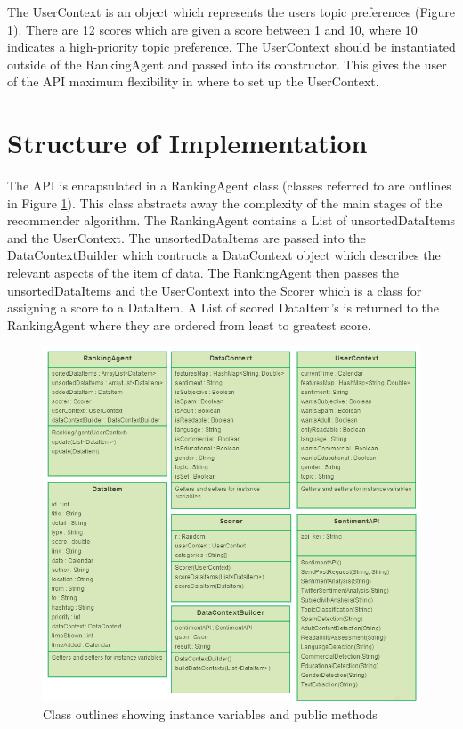 The UserContext is an object which represents the users topic preferences (Figure \ref{classes}). There are 12 scores which are given a score between 1 and 10, where 10 indicates a high-priority topic preference. The UserContext should be instantiated outside of the RankingAgent and passed into its constructor. This gives the user of the API maximum flexibility in where to set up the UserContext. 

\section{Structure of Implementation}

The API is encapsulated in a RankingAgent class (classes referred to are outlines in Figure \ref{classes}). This class abstracts away the complexity of the main stages of the recommender algorithm. The RankingAgent contains a List of unsortedDataItems and the UserContext. The unsortedDataItems are passed into the DataContextBuilder which contructs a DataContext object which describes the relevant aspects of the item of data. The RankingAgent then passes the unsortedDataItems and the UserContext into the Scorer which is a class for assigning a score to a DataItem. A List of scored DataItem's is returned to the RankingAgent where they are ordered from least to greatest score. 

\begin{figure}[ht!]
	\centering
	\includegraphics[width=155mm]{images/ProjectClasses.png}
	\caption{Class outlines showing instance variables and public methods}
	\label{classes}
\end{figure}

